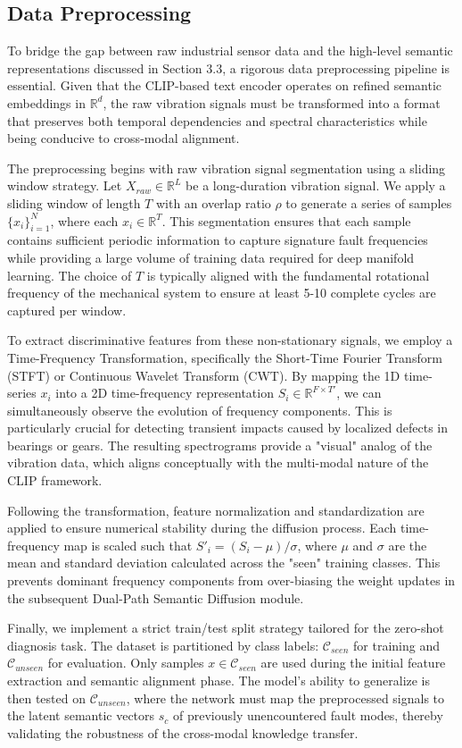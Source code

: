 \subsection{Data Preprocessing}
To bridge the gap between raw industrial sensor data and the high-level semantic representations discussed in Section 3.3, a rigorous data preprocessing pipeline is essential. Given that the CLIP-based text encoder operates on refined semantic embeddings in $\mathbb{R}^d$, the raw vibration signals must be transformed into a format that preserves both temporal dependencies and spectral characteristics while being conducive to cross-modal alignment.

The preprocessing begins with raw vibration signal segmentation using a sliding window strategy. Let $X_{raw} \in \mathbb{R}^L$ be a long-duration vibration signal. We apply a sliding window of length $T$ with an overlap ratio $\rho$ to generate a series of samples $\{x_i\}_{i=1}^N$, where each $x_i \in \mathbb{R}^T$. This segmentation ensures that each sample contains sufficient periodic information to capture signature fault frequencies while providing a large volume of training data required for deep manifold learning. The choice of $T$ is typically aligned with the fundamental rotational frequency of the mechanical system to ensure at least 5-10 complete cycles are captured per window.

To extract discriminative features from these non-stationary signals, we employ a Time-Frequency Transformation, specifically the Short-Time Fourier Transform (STFT) or Continuous Wavelet Transform (CWT). By mapping the 1D time-series $x_i$ into a 2D time-frequency representation $S_i \in \mathbb{R}^{F \times T'}$, we can simultaneously observe the evolution of frequency components. This is particularly crucial for detecting transient impacts caused by localized defects in bearings or gears. The resulting spectrograms provide a "visual" analog of the vibration data, which aligns conceptually with the multi-modal nature of the CLIP framework.

Following the transformation, feature normalization and standardization are applied to ensure numerical stability during the diffusion process. Each time-frequency map is scaled such that $S'_i = (S_i - \mu) / \sigma$, where $\mu$ and $\sigma$ are the mean and standard deviation calculated across the "seen" training classes. This prevents dominant frequency components from over-biasing the weight updates in the subsequent Dual-Path Semantic Diffusion module.

Finally, we implement a strict train/test split strategy tailored for the zero-shot diagnosis task. The dataset is partitioned by class labels: $\mathcal{C}_{seen}$ for training and $\mathcal{C}_{unseen}$ for evaluation. Only samples $x \in \mathcal{C}_{seen}$ are used during the initial feature extraction and semantic alignment phase. The model's ability to generalize is then tested on $\mathcal{C}_{unseen}$, where the network must map the preprocessed signals to the latent semantic vectors $s_c$ of previously unencountered fault modes, thereby validating the robustness of the cross-modal knowledge transfer.